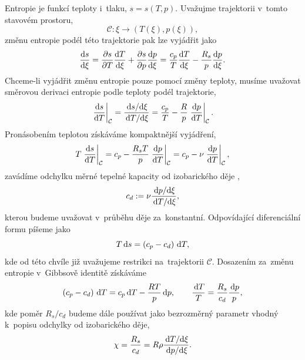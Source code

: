 Entropie je funkcí teploty i~tlaku, $s=s(T,p)$. Uvažujme trajektorii v~tomto stavovém prostoru,
\begin{equation}
    \mathcal{C}:\xi\to\left(T(\xi),p(\xi)\right),
\end{equation}
změnu entropie podél této trajektorie pak lze vyjádřit jako
\begin{equation}
    \frac{\mathrm{d} s}{\mathrm{d} \xi}=\frac{\partial s}{\partial T}\frac{\mathrm{d} T}{\mathrm{d} \xi}+\frac{\partial s}{\partial p}\frac{\mathrm{d} p}{\mathrm{d} \xi}=\frac{c_p}{T}\frac{\mathrm{d} T}{\mathrm{d} \xi}-\frac{R_s}{p}\frac{\mathrm{d} p}{\mathrm{d} \xi}.
\end{equation}
Chceme-li vyjádřit změnu entropie pouze pomocí změny teploty, musíme uvažovat směrovou derivaci entropie podle teploty podél trajektorie,
\begin{equation}
    \left.\frac{\mathrm{d} s}{\mathrm{d} T}\right|_{\mathcal{C}}=\frac{\,\mathrm{d}{s}/\!\,\mathrm{d}{\xi}}{\,\mathrm{d}{T}/\!\,\mathrm{d}{\xi}}=\frac{c_p}{T} - \frac{R}{p}\left.\frac{\mathrm{d} p}{\mathrm{d} T}\right|_{\mathcal{C}}.
\end{equation}
Pronásobením teplotou získáváme kompaktnější vyjádření,
\begin{equation}
    T\left.\frac{\mathrm{d} s}{\mathrm{d} T}\right|_{\mathcal{C}}=c_p - \frac{R_s T}{p}\left.\frac{\mathrm{d} p}{\mathrm{d} T}\right|_{\mathcal{C}}=c_p - \nu\left.\frac{\mathrm{d} p}{\mathrm{d} T}\right|_{\mathcal{C}},
\end{equation}
zavádíme odchylku měrné tepelné kapacity od izobarického děje ,
\begin{equation}
    c_d:=\nu\frac{\,\mathrm{d}{p}/\!\,\mathrm{d}{\xi}}{\,\mathrm{d}{T}/\!\,\mathrm{d}{\xi}},
\end{equation}
kterou budeme uvažovat v~průběhu děje za~konstantní. Odpovídající diferenciální formu píšeme jako
\begin{equation}
    T\,\mathrm{d}{s}=\left(c_p-c_d\right)\,\mathrm{d}{T},
\end{equation}
kde od této chvíle již uvažujeme restrikci na~trajektorii $\mathcal{C}$. Dosazením za~změnu entropie v~Gibbsově identitě získáváme
\begin{equation}
    \left(c_p-c_d\right)\,\mathrm{d}{T}=c_p\,\mathrm{d}{T}-\frac{RT}{p}\,\mathrm{d}{p},\qquad \frac{\,\mathrm{d}{T}}{T}=\frac{R_s}{c_d}\frac{\,\mathrm{d}{p}}{p},
\end{equation}
kde poměr $R_s/c_d$ budeme dále používat jako bezrozměrný parametr vhodný k~popisu odchylky od izobarického děje,
\begin{equation}
    \chi=\frac{R_s}{c_d}=R\rho \frac{\,\mathrm{d}{T}/\!\,\mathrm{d}{\xi}}{\,\mathrm{d}{p}/\!\,\mathrm{d}{\xi}}.
\end{equation}


